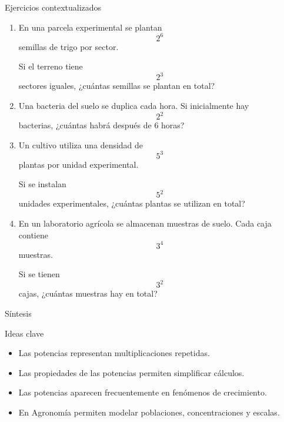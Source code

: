 \documentclass[aspectratio=169,10pt,handout]{beamer}
\begin{document}
	\begin{frame}{Ejercicios contextualizados}
		\begin{enumerate}
			\item En una parcela experimental se plantan
			\[
			2^6
			\]
			semillas de trigo por sector.
			
			Si el terreno tiene
			\[
			2^3
			\]
			sectores iguales, ¿cuántas semillas se plantan en total?
			
			\pause
			
			\item Una bacteria del suelo se duplica cada hora. Si inicialmente hay
			\[
			2^2
			\]
			bacterias, ¿cuántas habrá después de 6 horas?
			
			\pause
			
			\item Un cultivo utiliza una densidad de
			\[
			5^3
			\]
			plantas por unidad experimental.
			
			Si se instalan
			\[
			5^2
			\]
			unidades experimentales, ¿cuántas plantas se utilizan en total?
			
			\pause
			
			\item En un laboratorio agrícola se almacenan muestras de suelo. Cada caja contiene
			\[
			3^4
			\]
			muestras.
			
			Si se tienen
			\[
			3^2
			\]
			cajas, ¿cuántas muestras hay en total?
		\end{enumerate}
	\end{frame}
	
	\begin{frame}{Síntesis}
		\begin{block}{Ideas clave}
			\begin{itemize}
				\item Las potencias representan multiplicaciones repetidas.
				\item Las propiedades de las potencias permiten simplificar cálculos.
				\item Las potencias aparecen frecuentemente en fenómenos de crecimiento.
				\item En Agronomía permiten modelar poblaciones, concentraciones y escalas.
			\end{itemize}
		\end{block}
	\end{frame}
	
\end{document}
